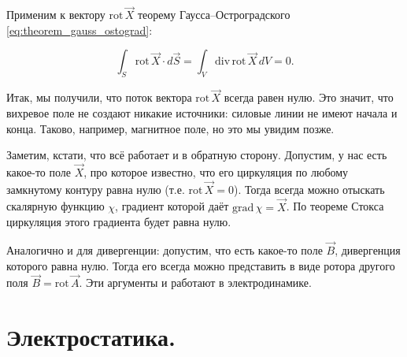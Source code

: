 \documentclass[12pt,a4paper]{article}
\numberwithin{equation}{section}
\numberwithin{equation}{section}
\newcommand{\pt}{\partial}
\newcommand{\grad}{\mathrm{grad}\,}
\newcommand{\rot}{\mathrm{rot}\,}
\renewcommand{\div}{\mathrm{div}\,}
\newcommand{\vn}{\vec{\nabla}}
\begin{document}
Применим к вектору $\rot \vec{X}$ теорему Гаусса--Остроградского
\eqref{eq:theorem_gauss_ostograd}:

\begin{equation}
  \label{eq:gauss_rot}
  \int_S \rot \vec{X} \cdot d\vec{S} = \int_V \div \rot \vec{X}\, dV = 0.
\end{equation}

Итак, мы получили, что поток вектора $\rot \vec{X}$ всегда равен
нулю. Это значит, что вихревое поле не создают никакие источники:
силовые линии не имеют начала и конца. Таково, например, магнитное
поле, но это мы увидим позже.

Заметим, кстати, что всё работает и в обратную сторону. Допустим, у
нас есть какое-то поле $\vec{X}$, про которое известно, что его
циркуляция по любому замкнутому контуру равна нулю (т.е. $\rot \vec{X}
=0$). Тогда всегда можно отыскать скалярную функцию $\chi$, градиент
которой даёт $\grad \chi = \vec{X}$. По теореме Стокса циркуляция
этого градиента будет равна нулю. 

Аналогично и для дивергенции: допустим, что есть какое-то поле $\vec{B}$,
дивергенция которого равна нулю. Тогда его всегда можно представить в
виде ротора другого поля $\vec{B} =\rot \vec{A}$. Эти аргументы и работают
в электродинамике. 






\section{Электростатика.}
\label{sec:statics}
\end{document}
